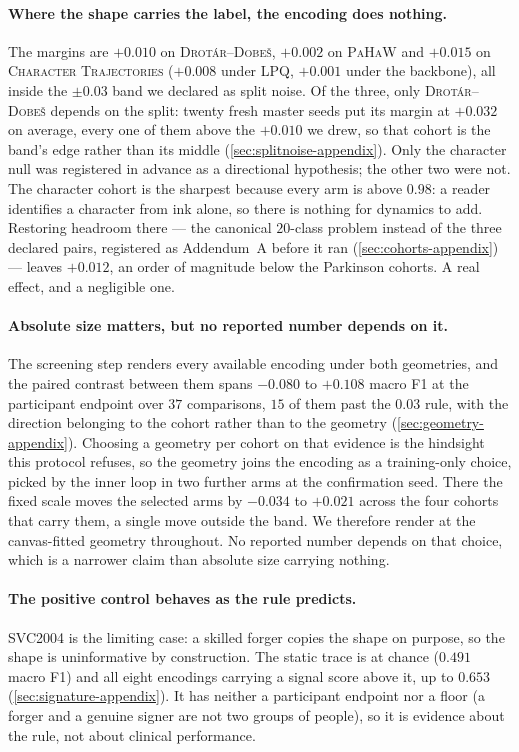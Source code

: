 \documentclass[10pt,a4paper]{article}
\begin{document}
\paragraph{Where the shape carries the label, the encoding does nothing.} The margins are
$+0.010$ on \textsc{Drot\'ar--Dobe\v{s}}, $+0.002$ on \textsc{PaHaW} and $+0.015$ on
\textsc{Character Trajectories} ($+0.008$ under LPQ, $+0.001$ under the backbone), all inside the
$\pm 0.03$ band we declared as split noise. Of the three, only
\textsc{Drot\'ar--Dobe\v{s}} depends on the split: twenty fresh master seeds put its margin at
$+0.032$ on average, every one of them above the $+0.010$ we drew, so that cohort is the band's
edge rather than its middle (\cref{sec:splitnoise-appendix}). Only the character null was
registered in advance as a directional hypothesis; the other two were not. The character cohort is
the sharpest because every arm is above $0.98$: a reader identifies a character from ink alone, so
there is nothing for dynamics to add. Restoring headroom there --- the canonical $20$-class problem
instead of the three declared pairs, registered as Addendum~A before it ran
(\cref{sec:cohorts-appendix}) --- leaves $+0.012$, an order of magnitude below the Parkinson
cohorts. A real effect, and a negligible one.

\paragraph{Absolute size matters, but no reported number depends on it.} The screening step
renders every available encoding under both geometries, and the paired contrast between them spans
$-0.080$ to $+0.108$ macro F1 at the participant endpoint over $37$ comparisons, $15$ of them past
the $0.03$ rule, with the direction belonging to the cohort rather than to the geometry
(\cref{sec:geometry-appendix}). Choosing a geometry per cohort on that evidence is the hindsight
this protocol refuses, so the geometry joins the encoding as a training-only choice, picked by the
inner loop in two further arms at the confirmation seed. There the fixed scale moves the selected
arms by $-0.034$ to $+0.021$ across the
four cohorts that carry them, a single move outside the band. We therefore render at the
canvas-fitted geometry throughout. No reported number depends on that choice, which is a narrower
claim than absolute size carrying nothing.

\paragraph{The positive control behaves as the rule predicts.} \textsc{SVC2004} is the limiting
case: a skilled forger copies the shape on purpose, so the shape is uninformative by construction.
The static trace is at chance ($0.491$ macro F1) and all eight encodings carrying a signal score
above it, up to $0.653$ (\cref{sec:signature-appendix}). It has neither a participant endpoint nor a
floor (a forger and a genuine signer are not two groups of people), so it is evidence about the
rule, not about clinical performance.
\end{document}
